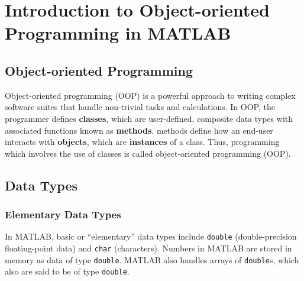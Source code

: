 
\section{Introduction to Object-oriented Programming in MATLAB}

\subsection{Object-oriented Programming}

Object-oriented programming (OOP) is a powerful approach to writing complex software suites that handle non-trivial tasks and calculations. In OOP, the programmer defines \textbf{classes}, which are user-defined, composite data types with associated functions known as \textbf{methods}. methods define how an end-user interacts with \textbf{objects}, which are \textbf{instances} of a class.  Thus, programming which involves the use of classes is called object-oriented programming (OOP).

\subsection{Data Types}

\subsubsection{Elementary Data Types}
In MATLAB, basic or ``elementary'' data types include \texttt{double} (double-precision floating-point data) and \texttt{char} (characters). Numbers in MATLAB are stored in memory as data of type \texttt{double}. MATLAB also handles arrays of \texttt{double}s, which also are said to be of type \texttt{double}.

